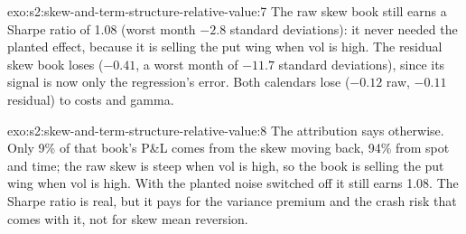 \begin{solution}{exo:s2:skew-and-term-structure-relative-value:7}
The raw skew book still earns a Sharpe ratio of 1.08 (worst month $-2.8$ standard deviations): it never needed the planted effect, because it is
selling the put wing when vol is high. The residual skew book loses ($-0.41$, a worst month of $-11.7$ standard deviations), since its signal is now
only the regression's error. Both calendars lose ($-0.12$ raw, $-0.11$ residual) to costs and gamma.
\end{solution}

\begin{solution}{exo:s2:skew-and-term-structure-relative-value:8}
The attribution says otherwise. Only 9\% of that book's P\&L comes from the skew moving back, 94\% from spot and time; the raw skew is steep when vol is
high, so the book is selling the put wing when vol is high. With the planted noise switched off it still earns 1.08. The Sharpe ratio is real, but it
pays for the variance premium and the crash risk that comes with it, not for skew mean reversion.
\end{solution}

